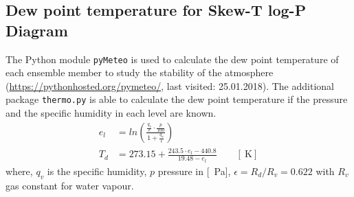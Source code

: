 \subsection{Dew point temperature for Skew-T log-P Diagram}
The Python module \texttt{pyMeteo} is used to calculate the dew point temperature of each ensemble member to study the stability of the atmosphere (\url{https://pythonhosted.org/pymeteo/}, last visited: 25.01.2018). The additional package \texttt{thermo.py} is able to calculate the dew point temperature if the pressure and the specific humidity in each level are known. 
\begin{align}
	e_l & = ln\left( \frac{\frac{q_v}{\epsilon} \cdot \frac{p}{100}}{1 + \frac{q_v}{\epsilon}} \right) \\
	T_d & = 273.15 + \frac{243.5 \cdot e_l -440.8}{19.48 -e_l} \qquad [\SI{}{\kelvin}]
\end{align}
where, $q_v$ is the specific humidity, $p$ pressure in [\SI{}{\Pa}], $\epsilon = R_d / R_v = 0.622$ with $R_v$ gas constant for water vapour.